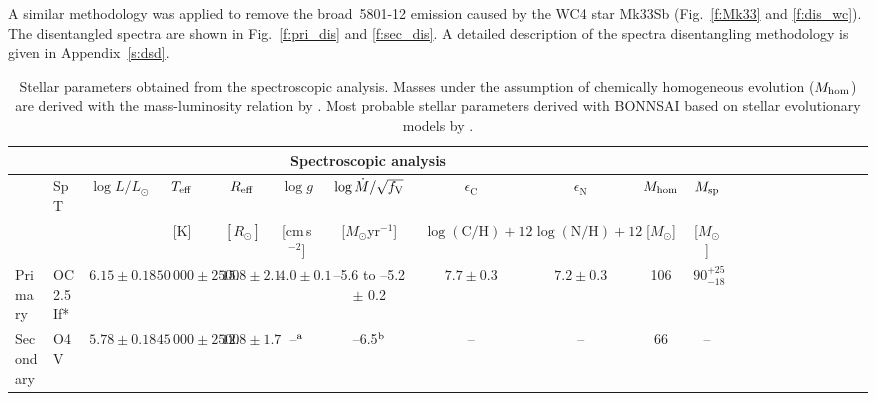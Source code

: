 \documentclass[fleqn,usenatbib]{mnras}
\begin{document}
A similar methodology was applied to remove the broad \,5801-12 emission caused by the WC4 star Mk33Sb (Fig.~\ref{f:Mk33} and \ref{f:dis_wc}). The disentangled spectra are shown in Fig.~\ref{f:pri_dis} and \ref{f:sec_dis}. A detailed description of the spectra disentangling methodology is given in Appendix~\ref{s:dsd}.


\begin{table*}
	\centering
	\caption{Stellar parameters obtained from the spectroscopic analysis. Masses under the assumption of chemically homogeneous evolution ($M_{\rm hom}$) are derived with the mass-luminosity relation by \citet{graefener2011}. Most probable stellar parameters derived with BONNSAI \citep{schneider2014} based on stellar evolutionary models by \citet{brott2011, koehler2015}.}
	\label{t:stel_param}
	\begin{tabular}{@{}l@{~~~}l@{~~~}c@{~~~}c@{~~~}c@{~~~}c@{~~~}c@{~~~}c@{~~~}c@{~~~}c@{~~~}c@{~~~}c@{~~~}c@{~~~}c@{~~~}c@{~~~}c@{~~~}c@{~~~}c@{~~~}c@{~~~}c@{~~~}c@{}} %
	\hline
			\multicolumn{11}{c}{Spectroscopic analysis} \\
		\hline
		 & SpT &$\log L/L_{\odot}$ & $T_{\rm eff}$ & $R_{\rm eff}$ & $\log g$ & $\log\dot{M}/\sqrt{f_{\rm V}}$ & $\epsilon_{\mathrm{C}}$ & $\epsilon_{\mathrm{N}}$ &$M_{\rm hom}$ & $M_{\rm sp}$ \\
		 &&                    & [K]               &$[R_{\odot}]$  & [cm\,s$^{-2}$] & [$M_{\odot}$yr$^{-1}$] & $\log(\mathrm{C/H})+12$ & $\log(\mathrm{N/H})+12$ & [$M_{\odot}$] & [$M_{\odot}$]\\
		\hline
		Primary  & OC2.5\,If* &$6.15\pm 0.18$ & $50\,000\pm 2500$ & $15.8\pm2.1$ & $4.0\pm 0.1$& --5.6 to --5.2 $\pm$ 0.2 & $7.7\pm0.3$ & $7.2\pm0.3$ & 106 & $90^{+25}_{-18}$\\
		Secondary& O4\,V  &$5.78\pm 0.18$ & $45\,000\pm 2500$ & $12.8\pm 1.7$ & --$^{\rm a}$        & --6.5$^{\rm b}$ & -- & -- & 66 & --\\
		\hline

\end{tabular}
\end{table*}
\end{document}
